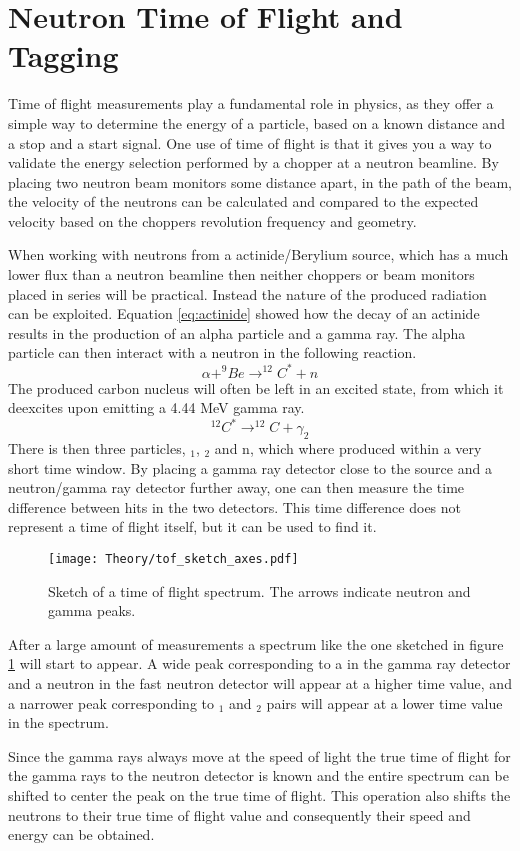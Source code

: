 \documentclass[main.tex]{subfiles}
\begin{document}
\section{Neutron Time of Flight and Tagging}
Time of flight measurements play a fundamental role in physics, as they offer a simple way to determine the energy of a particle, based on a known distance and a stop and a start signal. One use of time of flight is that it gives you a way to validate the energy selection performed by a chopper at a neutron beamline. By placing two neutron beam monitors some distance apart, in the path of the beam, the velocity of the neutrons can be calculated and compared to the expected velocity based on the choppers revolution frequency and geometry.

When working with neutrons from a actinide/Berylium source, which has a much lower flux than a neutron beamline then neither choppers or beam monitors placed in series will be practical. Instead the nature of the produced radiation can be exploited. Equation \ref{eq:actinide} showed how the decay of an actinide results in the production of an alpha particle and a gamma ray. The alpha particle can then interact with a neutron in the following reaction.
$$\alpha+^{9}Be\rightarrow^{12}C^{*}+n$$
The produced carbon nucleus will often be left in an excited state, from which it deexcites upon emitting a 4.44 MeV gamma ray. 
$$^{12}C^ {*}\rightarrow^{12}C+\gamma_2$$
There is then three particles, \textgamma$_\text{1}$, \textgamma$_\text{2}$ and n, which where produced within a very short time window. By placing a gamma ray detector close to the source and a neutron/gamma ray detector further away, one can then measure the time difference between hits in the two detectors. This time difference does not represent a time of flight itself, but it can be used to find it. 

\begin{figure}[t]
    \centering
        \texttt{[image: Theory/tof\_sketch\_axes.pdf]}
        \caption[Sketch of a time of flight spectrum.]{Sketch of a time of flight spectrum. The arrows indicate neutron and gamma peaks.}
    \label{fig:tof_sketch} 
\end{figure}

After a large amount of measurements a spectrum like the one sketched in figure \ref{fig:tof_sketch} will start to appear. A wide peak corresponding to a \textgamma\; in the gamma ray detector and a neutron in the fast neutron detector will appear at a higher time value, and a narrower peak corresponding to \textgamma$_\text{1}$ and \textgamma$_\text{2}$ pairs will appear at a lower time value in the spectrum.


Since the gamma rays always move at the speed of light the true time of flight for the gamma rays to the neutron detector is known and the entire spectrum can be shifted to center the \textgamma\textgamma\; peak on the true \textgamma\; time of flight. This operation also shifts the neutrons to their true time of flight value and consequently their speed and energy can be obtained.
\end{document}
